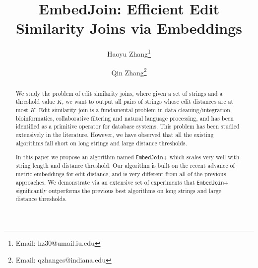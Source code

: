 \documentclass[11pt,notitlepage]{article}
\newcommand{\ebdjoin}{{\tt EmbedJoin}}
\begin{document}
\title{EmbedJoin: Efficient Edit Similarity Joins via Embeddings}

\author{Haoyu Zhang\thanks{Email: hz30@umail.iu.edu} }
\author{Qin Zhang\thanks{Email: qzhangcs@indiana.edu} }
\date{}
\maketitle



\begin{abstract}
We study the problem of edit similarity joins, where given a set of strings and a threshold value $K$, we want to output all pairs of strings whose edit distances are at most $K$.  Edit similarity join is a fundamental problem in data cleaning/integration, bioinformatics, collaborative filtering and natural language processing, and has been identified as a primitive operator for database systems.  This problem has been studied extensively in the literature. However, we  have observed that all the existing algorithms fall short on long strings and large distance thresholds.  

In this paper we propose an algorithm named \ebdjoin+ which scales very well with string length and distance threshold.  Our algorithm is built on the recent advance of metric embeddings for edit distance, and is very different from all of the previous approaches.  We demonstrate via an extensive set of experiments that \ebdjoin+ significantly outperforms the previous best algorithms on long strings and large distance thresholds. 
\end{abstract}



\maketitle




\end{document}
